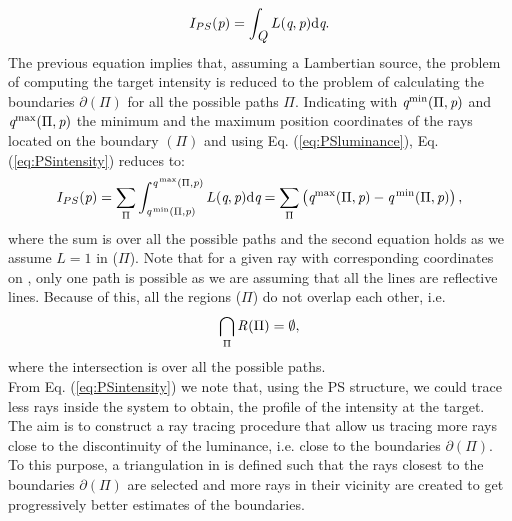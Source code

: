 \begin{equation}
\label{eq:PSintensity}
I_{PS}(\textit{p}) = \int_{\mbox{$\emph{Q}_{\textit{}}$}}L(\textit{q}, \textit{p}) \textrm{d}\textit{q}.
\end{equation}
The previous equation implies that, assuming a Lambertian source, the problem of computing the target intensity is reduced to the problem of calculating the boundaries 
$\partial$$(\Pi)$ for all the possible paths $\Pi$. Indicating with $\textit{q}^\textrm{min}(\Pi,\textit{p})$ and $\textit{q}^\textrm{max}(\Pi,\textit{p})$ the minimum and the maximum position coordinates of the rays located on the boundary $(\Pi)$ and using Eq. (\ref{eq:PSluminance}), Eq. (\ref{eq:PSintensity}) reduces to:
\begin{equation}\label{eta2}
I_{PS}(\textit{p}) = \sum_{\Pi}\int_{\textit{q}^\textrm{\,min}(\Pi, \textit{p})}^{\textit{q}^\textrm{\,max}(\Pi,\textit{p})}L(\textit{q}, \textit{p})\textrm{d}\textit{q} = \sum_{\Pi}\big (\textit{q}^\textrm{max}(\Pi,\textit{p})-\textit{q}^\textrm{\,min}(\Pi,\textit{p})\big )\,,
\end{equation}
where the sum is over all the possible paths and the second equation holds as we assume $L=1$ in ($\Pi$). 
Note that for a given ray with corresponding coordinates 
on , only one path is possible as we are assuming that all the lines are reflective lines.
Because of this, all the regions ($\Pi$) do not overlap each other, i.e. 
\begin{equation}
\bigcap_{\Pi}\mbox{$\emph{R}_{\textit{}}$}(\Pi)= \emptyset,
\end{equation}
where the intersection is over all the possible paths. \\ \indent
From Eq. (\ref{eq:PSintensity}) we note that, using the PS structure, we could trace less rays inside the system to obtain, the profile of the intensity at the target. 
The aim is to construct a ray tracing procedure that allow us tracing more rays close to the discontinuity of the luminance, i.e. close to the boundaries $\partial$$(\Pi)$. 
To this purpose, a triangulation in  is defined such that the rays closest to the boundaries $\partial$$(\Pi)$ 
are selected and more rays in their vicinity are created to get progressively better estimates of the boundaries.\\ \indent
